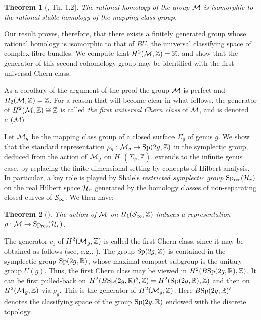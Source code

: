 \documentclass[twoside]{irmaems}
\theoremstyle{plain}
\newtheorem{theorem}{Theorem}[section]
\theoremstyle{definition}
\theoremstyle{remark}
\newcommand{\Z}{{\mathbb{Z}}}
\newcommand{\R}{{\mathbb{R}}}
\newcommand{\M}{{{\cal M}}}
\begin{document}
\begin{theorem}[\cite{fu-ka3}, Th. 1.2]
The rational homology of the group ${\cal M}$ is isomorphic to 
the rational stable homology of the mapping class group.

\end{theorem}

\vspace{0.1cm}\noindent 
Our result proves, therefore, that there exists a finitely generated 
group whose rational homology is isomorphic to that of $BU$, the universal classifying space 
of complex fibre bundles. We compute that  $H^2({\cal M},\Z)=\Z$, and show that the generator 
of this second cohomology group may be identified with 
the first universal Chern class.





\vspace{0.1cm}\noindent 
\noindent As a corollary  of the argument of the proof 
the group $\M$ is perfect and 
$H_2(\M,\Z)=\Z$. For a reason that will become clear in what follows, the generator of $H^2(\M,\Z)\cong \Z$ is called 
{\em the first universal Chern class} of $\M$, and is denoted $c_1(\M)$. 

\vspace{0.1cm}\noindent 
\noindent Let ${\cal M}_g$ be the mapping class group of a closed surface $\Sigma_g$ of genus $g$. We show that  the standard representation 
$\rho_g: {\cal M}_g\rightarrow {\rm Sp}(2g,\Z)$ in the symplectic group,  
deduced from the 
action of ${\cal M}_g$ on  $H_1(\Sigma_g,\Z)$, extends to 
the infinite genus case, by replacing the finite dimensional setting by concepts of Hilbert analysis. In particular, a key role is played by Shale's {\it restricted 
  symplectic group} ${\rm Sp_{res}}({\cal H}_r)$ on the real Hilbert space ${\cal 
  H}_r$ generated by the homology classes of non-separating closed curves of ${\cal 
  S}_{\infty}$. We then have:  
 
\begin{theorem}[\cite{fu-ka3}]\label{metab}
The action of $\M$ on $H_1({\cal S}_{\infty},\Z)$ induces a representation $\rho:\M\rightarrow {\rm Sp_{res}}({\cal H}_r)$. 
\end{theorem}  

\vspace{0.2cm} \noindent
 The generator $c_1$ of $H^2({\cal M}_g,\Z)$ is called the 
first Chern class, since it may be obtained as follows 
(see, e.g., \cite{mo}). The group ${\rm Sp}(2g,\Z)$ is 
contained in the symplectic group ${\rm Sp}(2g,\R)$, whose maximal compact subgroup 
is the unitary group $U(g)$. Thus, the first Chern class may be viewed in 
$H^2(B {\rm Sp}(2g,\R),\Z)$. It can be  first pulled-back on 
$H^2(B{\rm Sp}(2g,\R)^{\delta},\Z)=H^2({\rm Sp}(2g,\R),\Z)$ and 
then on $H^2({\cal   M}_g,\Z)$ via $\rho_g$. 
This is the generator of $H^2({\cal M}_g,\Z)$. 
Here $B{\rm Sp}(2g,\R)^{\delta}$ 
denotes the classifying space of the group ${\rm Sp}(2g,\R)$ endowed with  
the discrete topology. 
\end{document}
